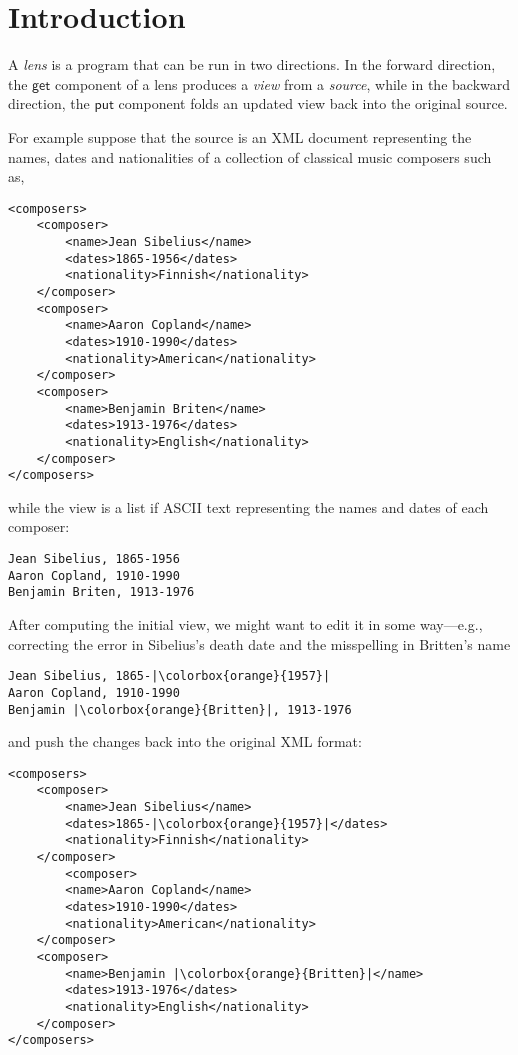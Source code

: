 \documentclass[acmsmall,review,anonymous]{acmart}\settopmatter{printfolios=true,printccs=false,printacmref=false}
\newcommand{\kw}[1]{\ensuremath{\mathsf{#1}}\xspace}
\newcommand{\get}{\ensuremath{\kw{get}}\xspace}
\newcommand{\pput}{\ensuremath{\kw{put}}\xspace}
\begin{document}
\section{Introduction}
A {\em lens} is a program that can be run in two directions. In the
forward direction, the \get component of a lens produces a {\em view}
from a {\em source}, while in the backward direction, the \pput component folds
an updated view back into the original source.

For example suppose that the source is an XML document representing the
names, dates and nationalities of a collection of classical music
composers such as,

\begin{lstlisting}
<composers>
    <composer>
        <name>Jean Sibelius</name>
        <dates>1865-1956</dates>
        <nationality>Finnish</nationality>
    </composer>
    <composer>
        <name>Aaron Copland</name>
        <dates>1910-1990</dates>
        <nationality>American</nationality>
    </composer>
    <composer>
        <name>Benjamin Briten</name>
        <dates>1913-1976</dates>
        <nationality>English</nationality>
    </composer>
</composers>
\end{lstlisting}

while the view is a list if ASCII text representing the names and dates of each
composer:
\begin{lstlisting}
Jean Sibelius, 1865-1956
Aaron Copland, 1910-1990
Benjamin Briten, 1913-1976
\end{lstlisting}

After computing the initial view, we might want to edit it in some way---e.g.,
correcting the error in Sibelius's death date and the misspelling in Britten's
name
\begin{lstlisting}
Jean Sibelius, 1865-|\colorbox{orange}{1957}|
Aaron Copland, 1910-1990
Benjamin |\colorbox{orange}{Britten}|, 1913-1976
\end{lstlisting}
and push the changes back into the original XML format:
\begin{lstlisting}
<composers>
    <composer>
        <name>Jean Sibelius</name>
        <dates>1865-|\colorbox{orange}{1957}|</dates>
        <nationality>Finnish</nationality>
    </composer>
        <composer>
        <name>Aaron Copland</name>
        <dates>1910-1990</dates>
        <nationality>American</nationality>
    </composer>
    <composer>
        <name>Benjamin |\colorbox{orange}{Britten}|</name>
        <dates>1913-1976</dates>
        <nationality>English</nationality>
    </composer>
</composers>
\end{lstlisting}
\end{document}
